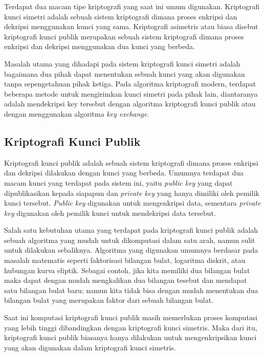   Terdapat dua macam tipe kriptografi yang saat ini umum digunakan. Kriptografi kunci simetri adalah sebuah sistem kriptografi dimana proses enkripsi dan dekripsi menggunakan kunci yang sama. Kriptografi asimetris atau biasa disebut kriptografi kunci publik merupakan sebuah sistem kriptografi dimana proses enkripsi dan dekripsi menggunakan dua kunci yang berbeda.

  Masalah utama yang dihadapi pada sistem kriptografi kunci simetri adalah bagaimana dua pihak dapat menentukan sebuah kunci yang akan digunakan tanpa sepengetahuan pihak ketiga. Pada algoritma kriptografi modern, terdapat beberapa metode untuk mengirimkan kunci simetri pada pihak lain, diantaranya adalah mendekripsi key tersebut dengan algoritma kriptografi kunci publik atau dengan menggunakan algoritma \textit{key exchange}.

  \subsection{Kriptografi Kunci Publik}

    Kriptografi kunci publik adalah sebuah sistem kriptografi dimana proses enkripsi dan dekripsi dilakukan dengan kunci yang berbeda. Umumnya terdapat dua macam kunci yang terdapat pada sistem ini, yaitu \textit{public key} yang dapat dipublikasikan kepada siapapun dan \textit{private key} yang hanya dimiliki oleh pemilik kunci tersebut. \textit{Public key} digunakan untuk mengenkripsi data, sementara \textit{private key} digunakan oleh pemilik kunci untuk mendekripsi data tersebut.

    Salah satu kebutuhan utama yang terdapat pada kriptografi kunci publik adalah sebuah algoritma yang mudah untuk dikomputasi dalam satu arah, namun sulit untuk dilakukan sebaliknya. Algoritma yang digunakan umumnya berdasar pada masalah matematis seperti faktorisasi bilangan bulat, logaritma diskrit, atau hubungan kurva eliptik. Sebagai contoh, jika kita memiliki dua bilangan bulat maka dapat dengan mudah mengkalikan dua bilangan tesebut dan mendapat satu bilangan bulat baru; namun kita tidak bisa dengan mudah menentukan dua bilangan bulat yang merupakan faktor dari sebuah bilangan bulat.

    Saat ini komputasi kriptografi kunci publik masih memerlukan proses komputasi yang lebih tinggi dibandingkan dengan kriptografi kunci simetris. Maka dari itu, kriptografi kunci publik biasanya hanya dilakukan untuk mengenkripsikan kunci yang akan digunakan dalam kriptografi kunci simetris.

